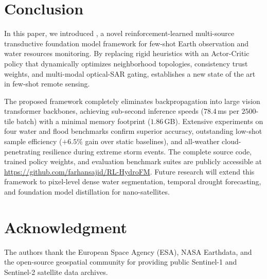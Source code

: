 \section{Conclusion}
\label{sec:conclusion}
In this paper, we introduced \rllctim{}, a novel reinforcement-learned multi-source transductive foundation model framework for few-shot Earth observation and water resources monitoring. By replacing rigid heuristics with an Actor-Critic policy that dynamically optimizes neighborhood topologies, consistency trust weights, and multi-modal optical-SAR gating, \rllctim{} establishes a new state of the art in few-shot remote sensing. 

The proposed framework completely eliminates backpropagation into large vision transformer backbones, achieving sub-second inference speeds ($78.4$\,ms per $2500$-tile batch) with a minimal memory footprint ($1.86$\,GB). Extensive experiments on four water and flood benchmarks confirm superior accuracy, outstanding low-shot sample efficiency ($+6.5\%$ gain over static baselines), and all-weather cloud-penetrating resilience during extreme storm events. The complete source code, trained policy weights, and evaluation benchmark suites are publicly accessible at \url{https://github.com/farhansajid/RL-HydroFM}. Future research will extend this framework to pixel-level dense water segmentation, temporal drought forecasting, and foundation model distillation for nano-satellites.

\section*{Acknowledgment}
The authors thank the European Space Agency (ESA), NASA Earthdata, and the open-source geospatial community for providing public Sentinel-1 and Sentinel-2 satellite data archives.
